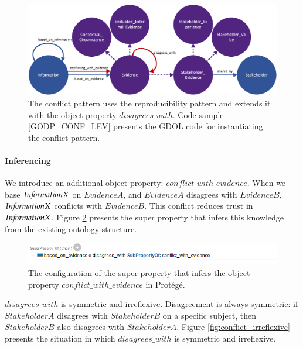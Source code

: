\begin{figure}[H]
\centering
  \includegraphics[width=14cm]{../../Images/04_Contribution/04_Conflict_Ontology.png}
  \caption{The conflict pattern uses the reproducibility pattern and extends it with the object property $disagrees\_with$. Code sample \ref{GODP_CONF_LEV} presents the GDOL code for instantiating the conflict pattern.}
  \label{fig:conflict}
\end{figure}

\paragraph{Inferencing}
We introduce an additional object property: $conflict\_with\_evidence$. When we base $In{\mkern-2mu f\mkern-3mu}ormationX$ on $EvidenceA$, and $EvidenceA$ disagrees with $EvidenceB$, $In{\mkern-2mu f\mkern-3mu}ormationX$ conflicts with $EvidenceB$. This conflict reduces trust in $In{\mkern-2mu f\mkern-3mu}ormationX$. Figure \ref{fig:conflict_inferred} presents the super property that infers this knowledge from the existing ontology structure.

\begin{figure}[H]
\centering
  \includegraphics[width=17cm]{../../Images/Conflict_Inferred.png}
  \caption{The configuration of the super property that infers the object property $conflict\_with\_evidence$ in Prot\'eg\'e.}
  \label{fig:conflict_inferred}
\end{figure}

$disagrees\_with$ is symmetric and irreflexive. Disagreement is always symmetric: if $StakeholderA$ disagrees with $StakeholderB$ on a specific subject, then $StakeholderB$ also disagrees with $StakeholderA$. Figure \ref{fig:conflict_irreflexive} presents the situation in which $disagrees\_with$ is symmetric and irreflexive.

